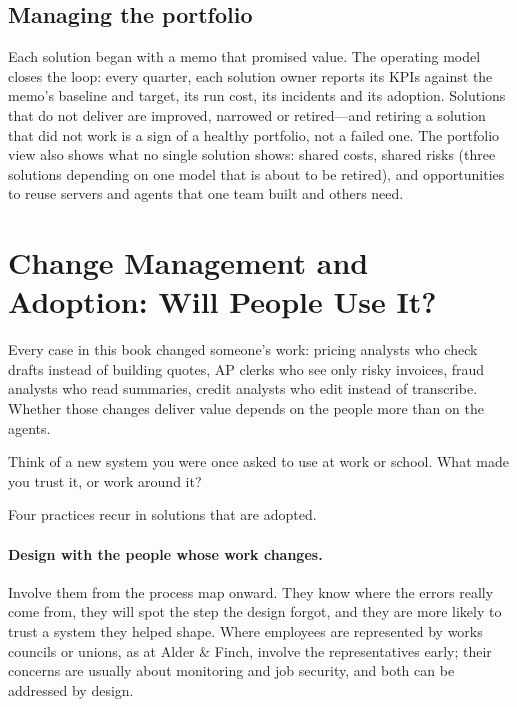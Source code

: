 \subsection{Managing the portfolio}

Each solution began with a memo that promised value. The operating model closes the loop: every quarter, each solution owner reports its KPIs against the memo's baseline and target, its run cost, its incidents and its adoption. Solutions that do not deliver are improved, narrowed or retired---and retiring a solution that did not work is a sign of a healthy portfolio, not a failed one. The portfolio view also shows what no single solution shows: shared costs, shared risks (three solutions depending on one model that is about to be retired), and opportunities to reuse servers and agents that one team built and others need.

\section{Change Management and Adoption: Will People Use It?}
\label{sec:cap-change}

Every case in this book changed someone's work: pricing analysts who check drafts instead of building quotes, AP clerks who see only risky invoices, fraud analysts who read summaries, credit analysts who edit instead of transcribe. Whether those changes deliver value depends on the people more than on the agents.

\begin{thinkabout}
Think of a new system you were once asked to use at work or school. What made you trust it, or work around it?
\end{thinkabout}

 Four practices recur in solutions that are adopted.

\paragraph{Design with the people whose work changes.} Involve them from the process map onward. They know where the errors really come from, they will spot the step the design forgot, and they are more likely to trust a system they helped shape. Where employees are represented by works councils or unions, as at Alder \& Finch, involve the representatives early; their concerns are usually about monitoring and job security, and both can be addressed by design.

